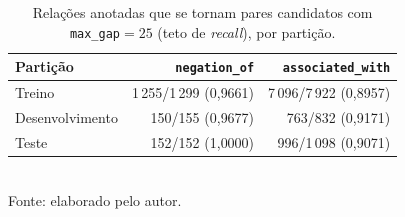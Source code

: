 \begin{table}[htbp]
  \centering
  \caption{Relações anotadas que se tornam pares candidatos com \texttt{max\_gap}$=25$ (teto de \emph{recall}), por partição.}
  \label{tab:teto_recall}
  \begin{tabular}{lrr}
  \toprule
  Partição & \texttt{negation\_of} & \texttt{associated\_with} \\
  \midrule
Treino & 1\,255/1\,299 (0{,}9661) & 7\,096/7\,922 (0{,}8957) \\
Desenvolvimento & 150/155 (0{,}9677) & 763/832 (0{,}9171) \\
Teste & 152/152 (1{,}0000) & 996/1\,098 (0{,}9071) \\
  \bottomrule
  \end{tabular}\\[4pt]
  {\footnotesize Fonte: elaborado pelo autor.}
\end{table}
